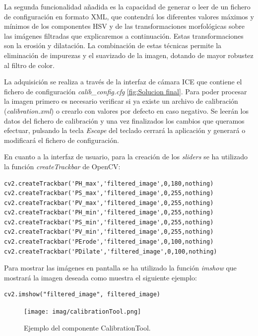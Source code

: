 La segunda funcionalidad añadida es la capacidad de generar o leer de un fichero de configuración en formato XML, que contendrá los diferentes valores máximos y mínimos de los componentes HSV y de las transformaciones morfológicas sobre las imágenes filtradas que explicaremos a continuación. Estas transformaciones  son la erosión y dilatación. La combinación de estas técnicas permite la eliminación de impurezas y el suavizado de la imagen, dotando de mayor robustez al filtro de color.

La adquisición se realiza a través de la interfaz de cámara ICE que contiene el fichero de configuración \textit{calib\_config.cfg} \ref{fig:Solucion final}. Para poder procesar la imagen primero es necesario verificar si ya existe un archivo de calibración (\textit{calibration.xml}) o crearlo con valores por defecto en caso negativo. Se leerán los datos del fichero de calibración  y una vez finalizados los cambios que queramos efectuar, pulsando la tecla \textit{Escape} del teclado cerrará la aplicación y generará o modificará el fichero de configuración.

En cuanto a la interfaz de usuario, para la creación de los \textit{sliders} se ha utilizado la función \textit{createTrackbar} de OpenCV:
\begin{lstlisting}[backgroundcolor=\color{gray!15}]
cv2.createTrackbar('PH_max','filtered_image',0,180,nothing)
cv2.createTrackbar('PS_max','filtered_image',0,255,nothing)
cv2.createTrackbar('PV_max','filtered_image',0,255,nothing)
cv2.createTrackbar('PH_min','filtered_image',0,255,nothing)
cv2.createTrackbar('PS_min','filtered_image',0,255,nothing)
cv2.createTrackbar('PV_min','filtered_image',0,255,nothing)
cv2.createTrackbar('PErode','filtered_image',0,100,nothing)
cv2.createTrackbar('PDilate','filtered_image',0,100,nothing)
\end{lstlisting}

Para mostrar las imágenes en pantalla se ha utilizado la función \textit{imshow} que mostrará la imagen deseada como muestra el siguiente ejemplo:

\begin{lstlisting}[backgroundcolor=\color{gray!15}]
cv2.imshow("filtered_image", filtered_image)
\end{lstlisting}


\begin{figure}[H]
	\begin{center}	
		\texttt{[image: imag/calibrationTool.png]}
		\caption{Ejemplo del componente CalibrationTool.}
		\label{fig:Ejemplo CalibrationTool}
	\end{center}
\end{figure}